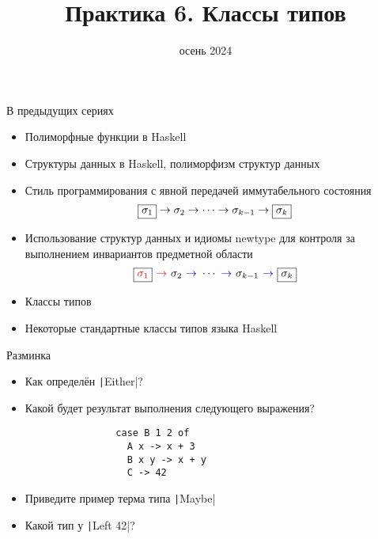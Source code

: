 
\newif\ifhandout




\title[6. Классы типов]{Практика 6. Классы типов}
\date{осень 2024}



    \setcounter{framenumber}{-1}
    \maketitle

    \begin{frame}[fragile]{В предыдущих сериях}
        \begin{itemize}
            \item Полиморфные функции в Haskell
            \item Структуры данных в Haskell, полиморфизм структур данных
            \item[\NB] Стиль программирования с явной передачей иммутабельного состояния
            \begin{equation*}
                \framebox{$\sigma_1$} \to \sigma_2 \to \cdots \to \sigma_{k - 1} \to \framebox{$\sigma_k$}
            \end{equation*}
            \item[\NB] Использование структур данных и идиомы newtype для контроля за выполнением инвариантов предметной области
            \begin{equation*}
                \framebox{\color{red}$\sigma_1$} {~\color{red} \rightarrow~} \sigma_2 {~\color{blue} \to~} \cdots {~\color{blue} \to~} \sigma_{k - 1} {~\color{blue} \to~} \framebox{$\sigma_k$}
            \end{equation*}
            \item[\newtopic] Классы типов
            \item[\newtopic] Некоторые стандартные классы типов языка Haskell
        \end{itemize}
    \end{frame}

    \begin{frame}[fragile]{Разминка}
        \begin{itemize}
            \item[\todo] Как определён \texttt|Either|?
            \item[\todo] Какой будет результат выполнения следующего выражения?
            \begin{verbatim}
                case B 1 2 of
                  A x -> x + 3
                  B x y -> x + y
                  C -> 42
            \end{verbatim}
            \item[\todo] Приведите пример терма типа \texttt|Maybe|
            \item[\todo] Какой тип у \texttt|Left 42|?
        \end{itemize}
    \end{frame}

